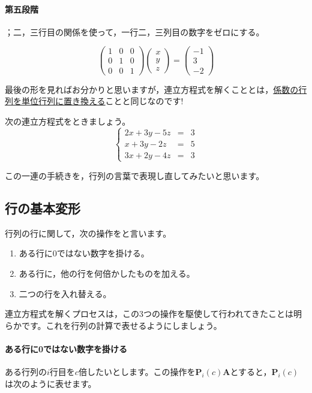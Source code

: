 \documentclass{ltjsbook}
\begin{document}
\paragraph{第五段階}；二，三行目の関係を使って，一行二，三列目の数字をゼロにする。

\[
	\begin{pmatrix} 1 & 0 & 0 \\
                0 & 1 & 0 \\
                0 & 0 & 1\end{pmatrix}
	\begin{pmatrix} x \\ y \\ z \end{pmatrix}
	=
	\begin{pmatrix} -1 \\  3 \\ -2 \end{pmatrix}
\]

最後の形を見ればお分かりと思いますが，連立方程式を解くこととは，\underline{係数の行列を単位行列に置き換える}ことと同じなのです!

\begin{reidai}{}{}
	次の連立方程式をときましょう。
	\[
		\left \{
		\begin{array}{lcl}
			2x+3y-5z & = & 3 \\
			x+3y-2z  & = & 5 \\
			3x+2y-4z & = & 3
		\end{array}
		\right .
	\]
\end{reidai}


この一連の手続きを，行列の言葉で表現し直してみたいと思います。
\subsection{行の基本変形}
行列の行に関して，次の操作をと言います。
\begin{enumerate}
	\item ある行に0ではない数字を掛ける。
	\item ある行に，他の行を何倍かしたものを加える。
	\item 二つの行を入れ替える。
\end{enumerate}
連立方程式を解くプロセスは，この3つの操作を駆使して行われてきたことは明らかです。これを行列の計算で表せるようにしましょう。

\paragraph{ある行に0ではない数字を掛ける}
ある行列の$i$行目を$c$倍したいとします。この操作を$\bm{P}_i(c)\bm{A}$とすると，$\bm{P}_i(c)$は次のように表せます。
\end{document}
